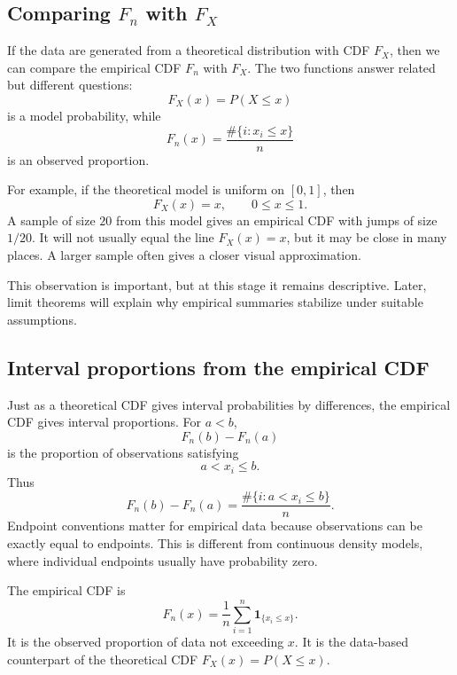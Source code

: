 \subsection*{Comparing \(F_n\) with \(F_X\)}

If the data are generated from a theoretical distribution with CDF \(F_X\), then
we can compare the empirical CDF \(F_n\) with \(F_X\). The two functions answer
related but different questions:
\[
F_X(x)=P(X\leq x)
\]
is a model probability, while
\[
F_n(x)=\frac{\#\{i:x_i\leq x\}}{n}
\]
is an observed proportion.

For example, if the theoretical model is uniform on \([0,1]\), then
\[
F_X(x)=x,
\qquad 0\leq x\leq1.
\]
A sample of size \(20\) from this model gives an empirical CDF with jumps of size
\(1/20\). It will not usually equal the line \(F_X(x)=x\), but it may be close in
many places. A larger sample often gives a closer visual approximation.

This observation is important, but at this stage it remains descriptive. Later,
limit theorems will explain why empirical summaries stabilize under suitable
assumptions.

\subsection*{Interval proportions from the empirical CDF}

Just as a theoretical CDF gives interval probabilities by differences, the
empirical CDF gives interval proportions. For \(a<b\),
\[
F_n(b)-F_n(a)
\]
is the proportion of observations satisfying
\[
a<x_i\leq b.
\]
Thus
\[
F_n(b)-F_n(a)=\frac{\#\{i:a<x_i\leq b\}}{n}.
\]
Endpoint conventions matter for empirical data because observations can be
exactly equal to endpoints. This is different from continuous density models,
where individual endpoints usually have probability zero.

\begin{summarybox}
The empirical CDF is
\[
F_n(x)=\frac1n\sum_{i=1}^n\mathbf{1}_{\{x_i\leq x\}}.
\]
It is the observed proportion of data not exceeding \(x\). It is the data-based
counterpart of the theoretical CDF \(F_X(x)=P(X\leq x)\).
\end{summarybox}
